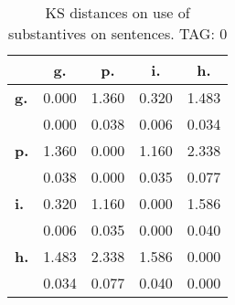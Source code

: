 \begin{table}[h!]
\begin{center}
\begin{tabular}{| l || c | c | c | c |}\hline
 & {\bf g.} & {\bf p.} & {\bf i.} & {\bf h.} \\\hline\hline
{\bf g.} & 0.000 & 1.360 & 0.320 & 1.483 \\
{\bf } & 0.000 & 0.038 & 0.006 & 0.034 \\\hline
{\bf p.} & 1.360 & 0.000 & 1.160 & 2.338 \\
{\bf } & 0.038 & 0.000 & 0.035 & 0.077 \\\hline
{\bf i.} & 0.320 & 1.160 & 0.000 & 1.586 \\
{\bf } & 0.006 & 0.035 & 0.000 & 0.040 \\\hline
{\bf h.} & 1.483 & 2.338 & 1.586 & 0.000 \\
{\bf } & 0.034 & 0.077 & 0.040 & 0.000 \\\hline
\end{tabular}
\caption{KS distances on use of substantives on sentences. TAG: 0}
\end{center}
\end{table}